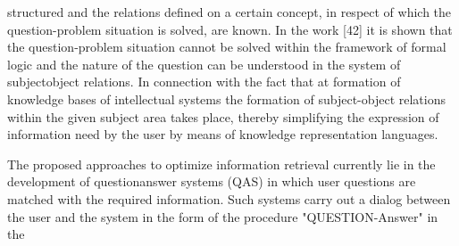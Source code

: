 \documentclass[a4paper]{article}
\begin{document}
\begin{multicols}{2}
{{structured and the relations defined on a certain concept,
in respect of which the question-problem situation is
solved, are known. In the work [42] it is shown that
the question-problem situation cannot be solved within
the framework of formal logic and the nature of the
question can be understood in the system of subjectobject relations. In connection with the fact that at
formation of knowledge bases of intellectual systems the
formation of subject-object relations within the given subject area takes place, thereby simplifying the expression
of information need by the user by means of knowledge
representation languages.\par
The proposed approaches to optimize information
retrieval currently lie in the development of questionanswer systems (QAS) in which user questions are
matched with the required information. Such systems
carry out a dialog between the user and the system in
the form of the procedure "QUESTION-Answer" in the
 \par
 }

}

\end{multicols}
\end{document}
